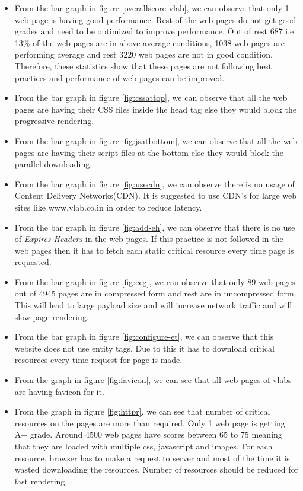 \documentclass[conference]{IEEEtran}
\begin{document}
\begin{itemize}
\item From the bar graph in figure \ref{overallscore-vlab}, we can observe that only 1 web page is having good
performance. Rest of the web pages do not get good grades and need to be
optimized to improve performance. Out of rest 687 i.e 13\% of the web pages are in above average conditions, 1038
web pages are performing average and rest 3220 web pages are not in good
condition. Therefore, these statistics show that these pages are not following
best practices and performance of web pages can be improved.  
 
\item From the bar graph in figure \ref{fig:cssattop}, we can observe that all the web pages are having their
CSS files inside the head tag else they would block the progressive rendering.

\item From the bar graph in figure \ref{fig:jsatbottom}, we can observe that all the web pages are having their
script files at the bottom else they would block the parallel downloading.

\item From the bar graph in figure \ref{fig:usecdn}, we can observe there is no usage of Content Delivery
Networks(CDN). It is suggested to use CDN's for large web sites like www.vlab.co.in in order to reduce latency.

\item From the bar graph in figure \ref{fig:add-eh}, we can observe that there is no use of {\it Expires
Headers} in the web pages. If this practice is not followed in the web pages then it has to
fetch each static critical resource every time page is requested.

\item From the bar graph in figure \ref{fig:ccg}, we can observe that only 89 web pages out of 4945
pages are in compressed form and rest are in uncompressed form. This will lead to
large payload size and will increase network traffic and will slow page rendering.

\item From the bar graph in figure \ref{fig:configure-et}, we can observe that this website does not use entity
tags. Due to this it has to download critical resources every time request for page is made.

\item From the graph in figure \ref{fig:favicon}, we can see that all web pages of vlabs are having favicon for it.

\item From the graph in figure \ref{fig:httpr}, we can see that number of critical resources on the pages
are more than required. Only 1 web page is getting A+ grade. Around 4500 web pages
have scores between 65 to 75 meaning that they are loaded with multiple css, javascript
and images. For each resource, browser has to make a request to server and most
of the time it is wasted downloading the resources. Number of resources should be
reduced for fast rendering.
\end{itemize}
\end{document}
